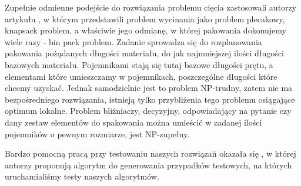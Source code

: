 Zupełnie odmienne podejście do rozwiązania problemu cięcia zastosowali autorzy artykułu \cite{bin-packing}, w którym przedstawili problem wycinania jako problem plecakowy, knapsack problem, a właściwie jego odmianę, w której pakowania dokonujemy wiele razy - bin pack problem. Zadanie sprowadza się do rozplanowania pakowania pożądanych długości materiału, do jak najmniejszej ilości długości bazowych materiału. Pojemnikami stają się tutaj bazowe długości prętu, a elementami które umieszczamy w pojemnikach, poszczególne długości które chcemy uzyskać. Jednak samodzielnie jest to problem NP-trudny, zatem nie ma bezpośredniego rozwiązania, istnieją tylko przybliżenia tego problemu osiągające optimum lokalne. Problem bliźniaczy, decyzyjny, odpowiadający na pytanie czy dany zestaw elementów do spakowania można umieścić w zadanej ilości pojemników o pewnym rozmiarze, jest NP-zupełny.

Bardzo pomocną pracą przy testowaniu naszych rozwiązań okazała się \cite{problem-generator}, w której autorzy proponują algorytm  do generowania przypadków testowych, na których uruchamialiśmy testy naszych algorytmów.
